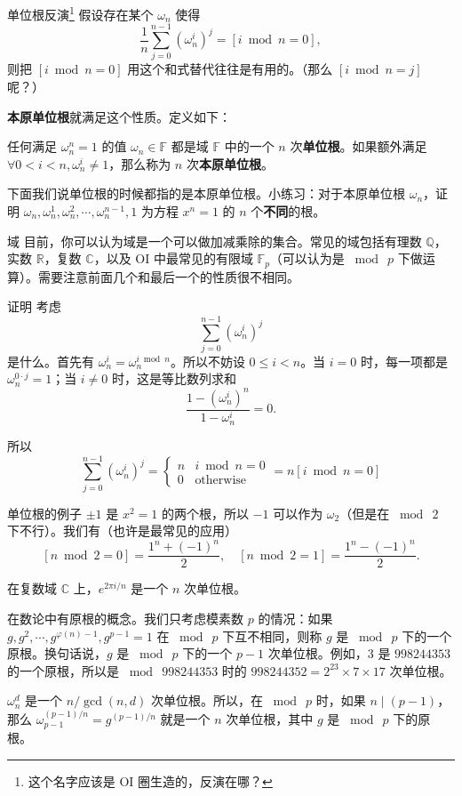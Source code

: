 \begin{frame}{单位根反演\footnote{这个名字应该是 OI 圈生造的，反演在哪？}}
    假设存在某个 $\omega_n$ 使得
    $$
    \frac{1}{n}\sum_{j=0}^{n-1}(\omega_n^i)^j=[i\bmod n=0],
    $$
    则把 $[i\bmod n=0]$ 用这个和式替代往往是有用的。（那么 $[i\bmod n=j]$ 呢？）

    \textbf{本原单位根}就满足这个性质。定义如下：
    \begin{definition}
        任何满足 $\omega_n^n=1$ 的值 $\omega_n\in\mathbb F$ 都是域 $\mathbb F$ 中的一个 $n$ 次\textbf{单位根}。如果额外满足 $\forall 0<i<n,\omega_n^i\ne 1$，那么称为 $n$ 次\textbf{本原单位根}。  
    \end{definition}
    下面我们说单位根的时候都指的是本原单位根。小练习：对于本原单位根 $\omega_n$，证明 $\omega_n,\omega_n^1,\omega_n^2,\cdots,\omega_n^{n-1},1$ 为方程 $x^n=1$ 的 $n$ 个\textbf{不同}的根。
\end{frame}
\begin{frame}{域}
    目前，你可以认为域是一个可以做加减乘除的集合。常见的域包括有理数 $\mathbb Q$，实数 $\mathbb R$，复数 $\mathbb C$，以及 OI 中最常见的有限域 $\mathbb F_p$（可以认为是 $\bmod\ p$ 下做运算）。需要注意前面几个和最后一个的性质很不相同。
\end{frame}
\begin{frame}{证明}
    考虑
    $$
    \sum_{j=0}^{n-1}(\omega_n^i)^j
    $$
    是什么。首先有 $\omega_n^{i}=\omega_n^{i\bmod n}$。所以不妨设 $0\le i<n$。当 $i=0$ 时，每一项都是 $\omega_n^{0\cdot j}=1$；当 $i\ne 0$ 时，这是等比数列求和
    $$
    \frac{1-(\omega_n^i)^n}{1-\omega_n^i}=0.
    $$

    所以
    $$
    \sum_{j=0}^{n-1}(\omega_n^i)^j=\begin{cases}
        n&i\bmod n=0\\
        0&\text{otherwise}
    \end{cases}
    =n[i\bmod n=0]
    $$
\end{frame}
\begin{frame}{单位根的例子}
    $\pm 1$ 是 $x^2=1$ 的两个根，所以 $-1$ 可以作为 $\omega_2$（但是在 $\bmod\ 2$ 下不行）。我们有（也许是最常见的应用）
    $$
    [n\bmod 2=0]=\frac{1^n+(-1)^n}{2},\quad [n\bmod 2=1]=\frac{1^n-(-1)^n}{2}.
    $$

    在复数域 $\mathbb C$ 上，$e^{2\pi i/n}$ 是一个 $n$ 次单位根。

    在数论中有原根的概念。我们只考虑模素数 $p$ 的情况：如果 $g,g^2,\cdots,g^{\varphi(n)-1},g^{p-1}=1$ 在 $\bmod\ p$ 下互不相同，则称 $g$ 是 $\bmod\ p$ 下的一个原根。换句话说，$g$ 是 $\bmod\ p$ 下的一个 $p-1$ 次单位根。例如，$3$ 是 $998244353$ 的一个原根，所以是 $\bmod\ 998244353$ 时的 $998244352=2^{23}\times 7\times 17$ 次单位根。

    $\omega_n^{d}$ 是一个 $n/\gcd(n,d)$ 次单位根。所以，在 $\bmod\ p$ 时，如果 $n\mid (p-1)$，那么 $\omega_{p-1}^{(p-1)/n}=g^{(p-1)/n}$ 就是一个 $n$ 次单位根，其中 $g$ 是 $\bmod\ p$ 下的原根。
\end{frame}
